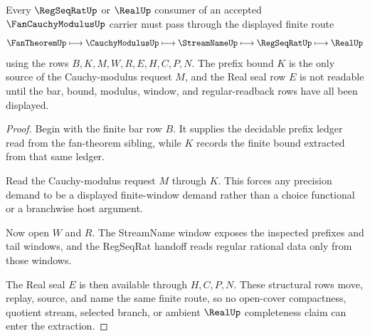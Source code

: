 \begin{theorem}
\label{thm:fan-cauchy-modulus-finite-bar-extraction}
Every $\RegSeqRatUp$ or $\RealUp$ consumer of an accepted $\FanCauchyModulusUp$ carrier must pass through the displayed finite route
$$
\FanTheoremUp\longmapsto \CauchyModulusUp\longmapsto \StreamNameUp\longmapsto \RegSeqRatUp\longmapsto \RealUp
$$
using the rows $B,K,M,W,R,E,H,C,P,N$. The prefix bound $K$ is the only source of the Cauchy-modulus request $M$, and the Real seal row $E$ is not readable until the bar, bound, modulus, window, and regular-readback rows have all been displayed.
\end{theorem}
\begin{proof}
Begin with the finite bar row $B$. It supplies the decidable prefix ledger read from the fan-theorem sibling, while $K$ records the finite bound extracted from that same ledger.

Read the Cauchy-modulus request $M$ through $K$. This forces any precision demand to be a displayed finite-window demand rather than a choice functional or a branchwise host argument.

Now open $W$ and $R$. The StreamName window exposes the inspected prefixes and tail windows, and the RegSeqRat handoff reads regular rational data only from those windows.

The Real seal $E$ is then available through $H,C,P,N$. These structural rows move, replay, source, and name the same finite route, so no open-cover compactness, quotient stream, selected branch, or ambient $\RealUp$ completeness claim can enter the extraction.
\end{proof}


\begin{closurestatus}{\FanCauchyModulusUp}
  \theoryclosure{\seedClosure}
  \formalstatus{\unformalizedV}
\end{closurestatus}
